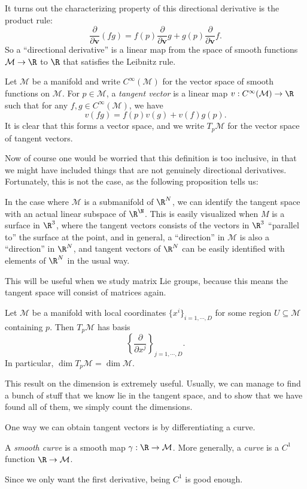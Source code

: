 \documentclass[a4paper]{article}
\begin{document}
It turns out the characterizing property of this directional derivative is the product rule:
\[
  \frac{\partial}{\partial \mathbf{v}}(fg) = f(p) \frac{\partial}{\partial \mathbf{v}} g + g(p) \frac{\partial}{\partial \mathbf{v}}f.
\]
So a ``directional derivative'' is a linear map from the space of smooth functions $\mathcal{M} \to \R$ to $\R$ that satisfies the Leibnitz rule.
\begin{defi}
  Let $\mathcal{M}$ be a manifold and write $C^\infty(\mathcal{M})$ for the vector space of smooth functions on $\mathcal{M}$. For $p \in \mathcal{M}$, a \emph{tangent vector} is a linear map $v: C^\infty(\mathcal{M}) \to \R$ such that for any $f, g \in C^\infty(\mathcal{M})$, we have
  \[
    v(fg) = f(p) v(g) + v(f) g(p).
  \]
  It is clear that this forms a vector space, and we write $T_p \mathcal{M}$ for the vector space of tangent vectors.
\end{defi}
Now of course one would be worried that this definition is too inclusive, in that we might have included things that are not genuinely directional derivatives. Fortunately, this is not the case, as the following proposition tells us:

In the case where $\mathcal{M}$ is a submanifold of $\R^N$, we can identify the tangent space with an actual linear subspace of $\R^\N$. This is easily visualized when $M$ is a surface in $\R^3$, where the tangent vectors consists of the vectors in $\R^3$ ``parallel to'' the surface at the point, and in general, a ``direction'' in $\mathcal{M}$ is also a ``direction'' in $\R^N$, and tangent vectors of $\R^N$ can be easily identified with elements of $\R^N$ in the usual way.

This will be useful when we study matrix Lie groups, because this means the tangent space will consist of matrices again.
\begin{prop}
  Let $\mathcal{M}$ be a manifold with local coordinates $\{x^i\}_{i = 1, \cdots, D}$ for some region $U \subseteq \mathcal{M}$ containing $p$. Then $T_p \mathcal{M}$ has basis
  \[
    \left\{\frac{\partial}{\partial x^j}\right\}_{j = 1, \cdots, D}.
  \]
  In particular, $\dim T_p \mathcal{M} = \dim \mathcal{M}$.
\end{prop}
This result on the dimension is extremely useful. Usually, we can manage to find a bunch of stuff that we know lie in the tangent space, and to show that we have found all of them, we simply count the dimensions.

One way we can obtain tangent vectors is by differentiating a curve.
\begin{defi}
  A \emph{smooth curve} is a smooth map $\gamma: \R \to \mathcal{M}$. More generally, a \emph{curve} is a $C^1$ function $\R \to \mathcal{M}$.
\end{defi}
Since we only want the first derivative, being $C^1$ is good enough.
\end{document}
